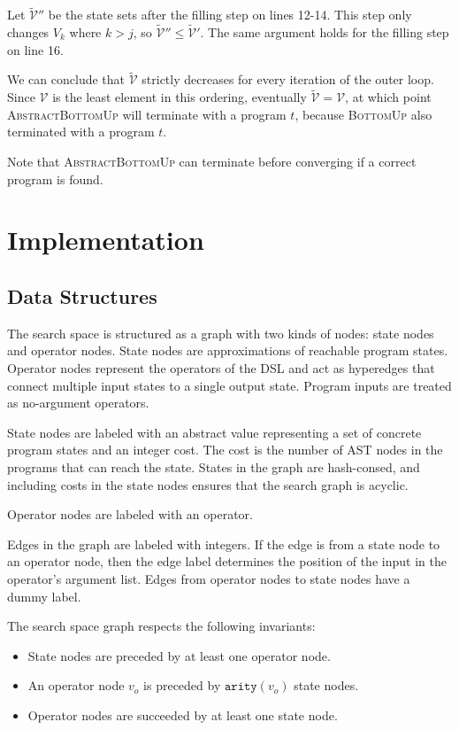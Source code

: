 \documentclass[review]{acmart}
\newcommand{\abs}[1]{\ensuremath{\widetilde{#1}}}
\begin{document}
Let $\abs{\mathcal{V}}''$ be the state sets after the filling step on lines
12-14. This step only changes $V_k$ where $k > j$, so $\abs{\mathcal{V}}'' \leq
\abs{\mathcal{V}}'$. The same argument holds for the filling step on line 16.

We can conclude that $\abs{\mathcal{V}}$ strictly decreases for every iteration
of the outer loop. Since $\mathcal{V}$ is the least element in this ordering,
eventually $\abs{\mathcal{V}} = \mathcal{V}$, at which point
\textsc{AbstractBottomUp} will terminate with a program $t$, because
\textsc{BottomUp} also terminated with a program $t$.

Note that \textsc{AbstractBottomUp} can terminate before converging if a correct
program is found.


\section{Implementation}
\subsection{Data Structures}

The search space is structured as a graph with two kinds of nodes: state nodes
and operator nodes. State nodes are approximations of reachable program states.
Operator nodes represent the operators of the DSL and act as hyperedges that
connect multiple input states to a single output state. Program inputs are
treated as no-argument operators.

State nodes are labeled with an abstract value representing a set of concrete
program states and an integer cost. The cost is the number of AST nodes in the
programs that can reach the state. States in the graph are hash-consed, and
including costs in the state nodes ensures that the search graph is acyclic.

Operator nodes are labeled with an operator.

Edges in the graph are labeled with integers. If the edge is from a state node
to an operator node, then the edge label determines the position of the input in
the operator's argument list. Edges from operator nodes to state nodes have a
dummy label.

The search space graph respects the following invariants:
\begin{itemize}
\item State nodes are preceded by at least one operator node.
\item An operator node $v_o$ is preceded by $\texttt{arity}(v_o)$ state nodes.
\item Operator nodes are succeeded by at least one state node.
\end{itemize}
\end{document}

